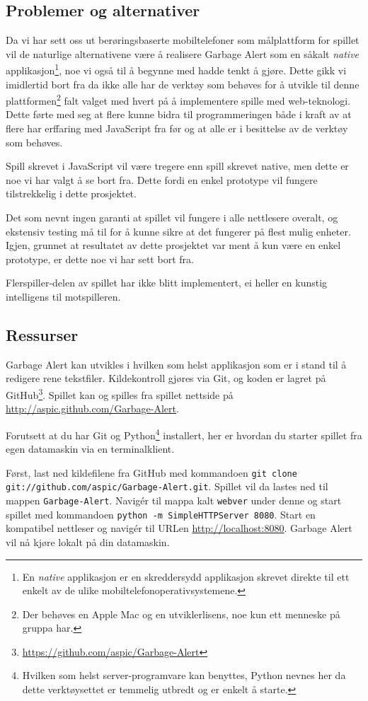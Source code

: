 \subsection{Problemer og alternativer}
Da vi har sett oss ut berøringsbaserte mobiltelefoner som målplattform for spillet vil de naturlige alternativene være å realisere Garbage Alert som en såkalt \emph{native} applikasjon\footnote{En \emph{native} applikasjon er en skreddersydd applikasjon skrevet direkte til ett enkelt av de ulike mobiltelefonoperativsystemene.}, noe vi også til å begynne med hadde tenkt å gjøre. Dette gikk vi imidlertid bort fra da ikke alle har de verktøy som behøves for å utvikle til denne plattformen\footnote{Der behøves en Apple Mac og en utviklerlisens, noe kun ett menneske på gruppa har.} falt valget med hvert på å implementere spille med web-teknologi. Dette førte med seg at flere kunne bidra til programmeringen både i kraft av at flere har erffaring med JavaScript fra før og at alle er i besittelse av de verktøy som behøves.

Spill skrevet i JavaScript vil være tregere enn spill skrevet native, men dette er noe vi har valgt å se bort fra. Dette fordi en enkel prototype vil fungere tilstrekkelig i dette prosjektet.

Det som nevnt ingen garanti at spillet vil fungere i alle nettlesere overalt, og ekstensiv testing må til for å kunne sikre at det fungerer på flest mulig enheter. Igjen, grunnet at resultatet av dette prosjektet var ment å kun være en enkel prototype, er dette noe vi har sett bort fra.

Flerspiller-delen av spillet har ikke blitt implementert, ei heller en kunstig intelligens til motspilleren.


\subsection{Ressurser}
Garbage Alert kan utvikles i hvilken som helst applikasjon som er i stand til å redigere rene tekstfiler. Kildekontroll gjøres via Git, og koden er lagret på GitHub\footnote{\url{https://github.com/aspic/Garbage-Alert}}. Spillet kan og spilles fra spillet nettside på \url{http://aspic.github.com/Garbage-Alert}.

Forutsett at du har Git og Python\footnote{Hvilken som helst server-programvare kan benyttes, Python nevnes her da dette verktøysettet er temmelig utbredt og er enkelt å starte.} installert, her er hvordan du starter spillet fra egen datamaskin via en terminalklient.

Først, last ned kildefilene fra GitHub med kommandoen \texttt{git clone git://github.com/aspic/Garbage-Alert.git}. Spillet vil da lastes ned til mappen \texttt{Garbage-Alert}. Navigér til mappa kalt \texttt{webver} under denne  og start spillet med kommandoen \texttt{python -m SimpleHTTPServer 8080}. Start en kompatibel nettleser og navigér til URLen \url{http://localhost:8080}. Garbage Alert vil nå kjøre lokalt på din datamaskin.
